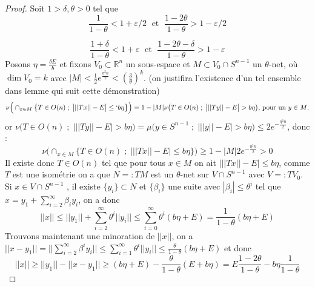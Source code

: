 \documentclass{report}
\begin{document}
\begin{proof}
	Soit $1>\delta,\theta>0$ tel que
	\begin{equation*}
		\frac{1}{1-\theta}<1+\varepsilon/2 \; \text{ et }\; \frac{1-2\theta}{1-\theta}>1-\varepsilon/2
	\end{equation*}
	
	\begin{equation*}
		\frac{1+\delta}{1-\theta}<1+\varepsilon \; \text{ et } \; \frac{1-2\theta -\delta}{1-\theta}>1-\varepsilon
	\end{equation*}
	Posons $\eta = \frac{\delta E}{b}$ et fixons $V_0\subset \mathbb{R}^n$ un sous-espace et $M\subset V_0\cap S^{n-1}$ un $\theta$-net, où $\dim V_0 = k$ \color{red}avec $|M|< \frac{1}{2}e^{\frac{\eta^2n}{2}}< (\frac{3}{\theta})^k$. \color{black} (on justifira l'existence d'un tel ensemble dans lemme qui suit cette démonstration)
	\begin{equation*}
		\nu\Big(\cap_{x\in M}\big\{T\in O(n)\; ; \;  \big| ||Tx||-E \big|\leq`  b\eta\big\}\Big)= 1-|M|\nu\big(T\in O(n)\; ; \; \big| ||Ty||-E \big|>b\eta\big) \text{,  pour un $y\in M$.}
	\end{equation*} 
	or $\nu\big(T\in O(n)\; ; \; \big| ||Ty||-E \big|>b\eta\big) = \mu\Big(y\in S^{n-1}\; ;\; \big| ||y||-E \big|>b\eta\Big)\leq 2e^{-\frac{\eta^2n}{2}}$, donc :
	\begin{equation*}
		\nu\Big(\cap_{x\in M}\big\{T\in O(n)\; ; \;  \big| ||Tx||-E \big|\leq b\eta\big\}\Big)\geq 1-|M|2 e^{-\frac{\eta^2 n}{2}}>0
	\end{equation*} 
	Il existe donc $T\in O(n)$ tel que pour tous $x\in M$ on ait $\big|||Tx||-E \big|\leq b \eta$, comme $T$ est une isométrie on a que $N=: TM$ est un $\theta$-net sur $V\cap S^{n-1}$ avec $V=:TV_0$.\\
	Si $x\in V\cap S^{n-1}$ , \color{red}il existe $\{y_i\}\subset N$ et $\{\beta_i\}$ une suite avec $|\beta_i|\leq \theta^i $  tel que $x = y_1 + \sum_{i=2}^{\infty} \beta_i y_i$,
	\color{black} 
	on a donc 
	\begin{equation*}
		||x||\leq ||y_1|| + \sum_{i=2}^{\infty} \theta ^{i} ||y_i||\leq \sum_{i=0}^{\infty}\theta^i (b\eta+E)=\frac{1}{1-\theta}(b\eta + E)
	\end{equation*}
	Trouvons maintenant une minoration de $||x||$, on a $||x-y_1||=\Big|\Big|\sum_{i=2}^{\infty}\beta^i y_i \Big|\Big|\leq \sum_{i=1}^{\infty}\theta^i || y_i|| \leq \frac{\theta}{1-\theta}(b\eta + E)$
	et donc 
	\begin{equation*}
		||x||\geq ||y_1|| - ||x-y_1|| \geq (b\eta + E) - \frac{\theta}{1-\theta}(E+b\eta)=E\frac{1-2\theta}{1-\theta}-b\eta\frac{1}{1-\theta}

\end{equation*}
\end{proof}
\end{document}
